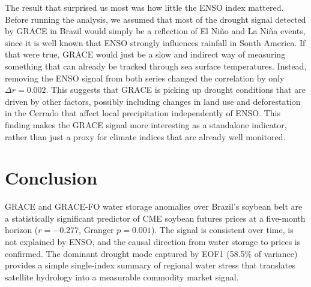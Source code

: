 \documentclass[6pt, twocolumn]{article}
\begin{document}
The result that surprised us most was how little the ENSO index
mattered. Before running the analysis, we assumed that most of the
drought signal detected by GRACE in Brazil would simply be a
reflection of El Niño and La Niña events, since it is well known
that ENSO strongly influences rainfall in South America. If that
were true, GRACE would just be a slow and indirect way of measuring
something that can already be tracked through sea surface
temperatures. Instead, removing the ENSO signal from both series
changed the correlation by only $\Delta r = 0.002$. This suggests
that GRACE is picking up drought conditions that are driven by
other factors, possibly including changes in land use and
deforestation in the Cerrado that affect local precipitation
independently of ENSO. This finding makes the GRACE signal more
interesting as a standalone indicator, rather than just a proxy
for climate indices that are already well monitored.

\FloatBarrier
\section*{Conclusion}

GRACE and GRACE-FO water storage anomalies over Brazil's soybean
belt are a statistically significant predictor of CME soybean
futures prices at a five-month horizon ($r = -0.277$,
Granger $p = 0.001$). The signal is consistent over time, is not
explained by ENSO, and the causal direction from water storage to
prices is confirmed. The dominant drought mode captured by EOF1
(58.5\% of variance) provides a simple single-index summary of
regional water stress that translates satellite hydrology into
a measurable commodity market signal.

\nocite{*}
\newpage
\printbibliography[heading=bibintoc, title={References}]
\end{document}

